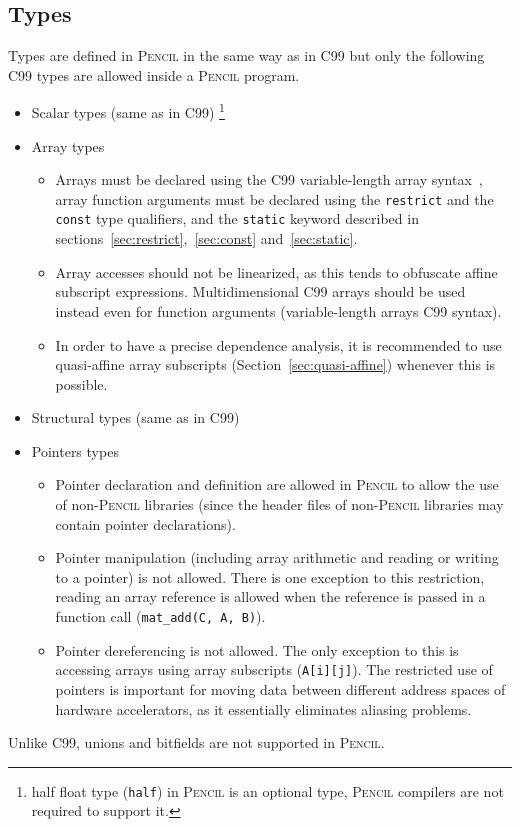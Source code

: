 \documentclass{carp}
\newcommand\pencil{\textsc{Pencil}\xspace}
\newcommand{\C}{C99\xspace}
\begin{document}
\subsection{Types\label{penciltypes}}
Types are defined in \pencil in the same way as in \C but
only the following \C types are allowed inside a \pencil program.
\begin{itemize}
  \item Scalar types (same as in \C)
      \footnote{half float type (\lstinline!half!) in \pencil is an optional
      type, \pencil compilers are not required to support it.}
  \item Array types
  \begin{itemize}
    \item Arrays must be declared using the C99
      variable-length array syntax~\cite{c99}, array function arguments
      must be declared using the \lstinline!restrict! and
      the \lstinline!const! type qualifiers, and the \lstinline!static! keyword
      described in sections~\ref{sec:restrict},~\ref{sec:const}
      and~\ref{sec:static}.
    \item Array accesses should not be linearized, as this tends to
      obfuscate affine subscript expressions.  Multidimensional C99 arrays
      should be used instead even for function arguments (variable-length arrays
      C99 syntax).
    \item In order to have a precise dependence analysis, it is recommended
      to use quasi-affine array subscripts (Section~\ref{sec:quasi-affine})
      whenever this is possible.
  \end{itemize}
  \item Structural types (same as in \C)
  \item Pointers types
  \begin{itemize}
    \item Pointer declaration and definition are allowed in
      \pencil to allow the use of non-\pencil libraries (since the header files
      of non-\pencil libraries may contain pointer declarations).
    \item Pointer manipulation (including array arithmetic and reading or
      writing to a pointer) is not allowed.  There is one exception to this
      restriction, reading an array reference is allowed when the reference is
      passed in a function call (\eg \lstinline!mat_add(C, A, B)!).
    \item Pointer dereferencing is not allowed.  The only exception to
      this is accessing arrays using array subscripts
      (\eg \lstinline!A[i][j]!).
    The restricted use of pointers is important for moving data between
    different address spaces of hardware accelerators, as it essentially
    eliminates aliasing problems.
  \end{itemize}    
\end{itemize}
Unlike \C, unions and bitfields are not supported in \pencil.
\end{document}

